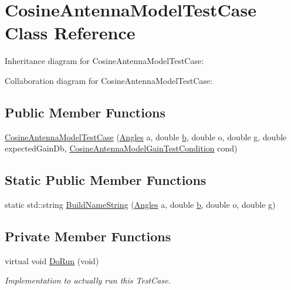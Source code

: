 \hypertarget{classCosineAntennaModelTestCase}{}\section{Cosine\+Antenna\+Model\+Test\+Case Class Reference}
\label{classCosineAntennaModelTestCase}


Inheritance diagram for Cosine\+Antenna\+Model\+Test\+Case\+:


Collaboration diagram for Cosine\+Antenna\+Model\+Test\+Case\+:
\subsection*{Public Member Functions}
\begin{DoxyCompactItemize}
\item 
\hyperlink{classCosineAntennaModelTestCase_af6f76d3544ffcbc0b68d9d321e5373ec}{Cosine\+Antenna\+Model\+Test\+Case} (\hyperlink{structns3_1_1Angles}{Angles} a, double \hyperlink{lte__pathloss_8m_a21ad0bd836b90d08f4cf640b4c298e7c}{b}, double o, double \hyperlink{loss__OH__suburban_8m_a6182af7c15da7a804d8d96b71bcd5ab7}{g}, double expected\+Gain\+Db, \hyperlink{test-cosine-antenna_8cc_ae8bcd1a3938ab2748667be8c74661c05}{Cosine\+Antenna\+Model\+Gain\+Test\+Condition} cond)
\end{DoxyCompactItemize}
\subsection*{Static Public Member Functions}
\begin{DoxyCompactItemize}
\item 
static std\+::string \hyperlink{classCosineAntennaModelTestCase_ac2c3324fb937499f524b7e7d85bcd59e}{Build\+Name\+String} (\hyperlink{structns3_1_1Angles}{Angles} a, double \hyperlink{lte__pathloss_8m_a21ad0bd836b90d08f4cf640b4c298e7c}{b}, double o, double \hyperlink{loss__OH__suburban_8m_a6182af7c15da7a804d8d96b71bcd5ab7}{g})
\end{DoxyCompactItemize}
\subsection*{Private Member Functions}
\begin{DoxyCompactItemize}
\item 
virtual void \hyperlink{classCosineAntennaModelTestCase_af5080960707daf23a44d2d68f73187f2}{Do\+Run} (void)
\begin{DoxyCompactList}\small\item\em Implementation to actually run this Test\+Case. \end{DoxyCompactList}\end{DoxyCompactItemize}
